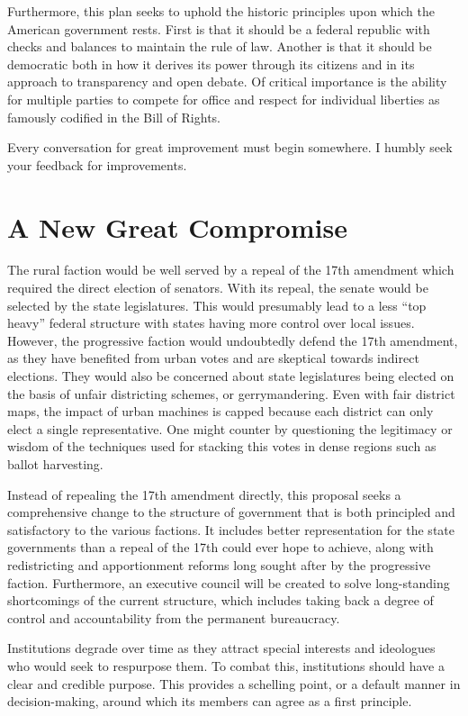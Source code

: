 \documentclass{article}
\newcommand{\quotes}[1]{``#1''}
\begin{document}
Furthermore, this plan seeks to uphold the historic principles upon which the American government rests. First is that it should be a federal republic with checks and balances to maintain the rule of law. Another is that it should be democratic both in how it derives its power through its citizens and in its approach to transparency and open debate. Of critical importance is the ability for multiple parties to compete for office and respect for individual liberties as famously codified in the Bill of Rights.

Every conversation for great improvement must begin somewhere. I humbly seek your feedback for improvements.

\section{A New Great Compromise}

The rural faction would be well served by a repeal of the 17th amendment\cite{Tucker}\cite{Virginia} which required the direct election of senators. With its repeal, the senate would be selected by the state legislatures. This would presumably lead to a less \quotes{top heavy} federal structure with states having more control over local issues. However, the progressive faction would undoubtedly defend the 17th amendment, as they have benefited from urban votes and are skeptical towards indirect elections\cite{Smith}. They would also be concerned about state legislatures being elected on the basis of unfair districting schemes, or gerrymandering. Even with fair district maps, the impact of urban machines is capped because each district can only elect a single representative. One might counter by questioning the legitimacy or wisdom of the techniques used for stacking this votes in dense regions such as ballot harvesting.

Instead of repealing the 17th amendment directly, this proposal seeks a comprehensive change to the structure of government that is both principled and satisfactory to the various factions. It includes better representation for the state governments than a repeal of the 17th could ever hope to achieve, along with redistricting and apportionment reforms long sought after by the progressive faction. Furthermore, an executive council will be created to solve long-standing shortcomings of the current structure, which includes taking back a degree of control and accountability from the permanent bureaucracy.

Institutions degrade over time as they attract special interests and ideologues who would seek to respurpose them. To combat this, institutions should have a clear and credible purpose. This provides a schelling point, or a default manner in decision-making, around which its members can agree as a first principle\cite{Komoroske}. 
\end{document}
